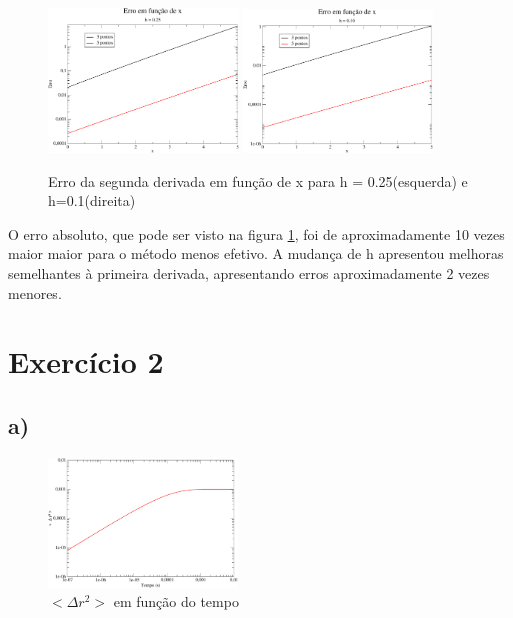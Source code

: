 \documentclass[a4wide]{report}
\begin{document}
\begin{figure}[!htb]
\centering
\includegraphics[width=0.45\textwidth]{erro2h2.pdf}%
\includegraphics[width=0.447\textwidth]{erro2h1.pdf}
\caption{Erro da segunda derivada em função de x para h = 0.25(esquerda) e h=0.1(direita)}
\label{erro2}
\end{figure}

O erro absoluto, que pode ser visto na figura \ref{erro2}, foi de aproximadamente 10 vezes maior maior para o método menos efetivo. A mudança de h apresentou melhoras semelhantes à primeira derivada, apresentando erros aproximadamente 2 vezes menores.






\section*{Exercício 2}

\subsection*{a)}

\begin{figure}[!htb]
\centering
\includegraphics[width=0.447\textwidth]{deltar.pdf}
\caption{$<\Delta r^{2}>$ em função do tempo}
\label{deltar}
\end{figure}
\end{document}
